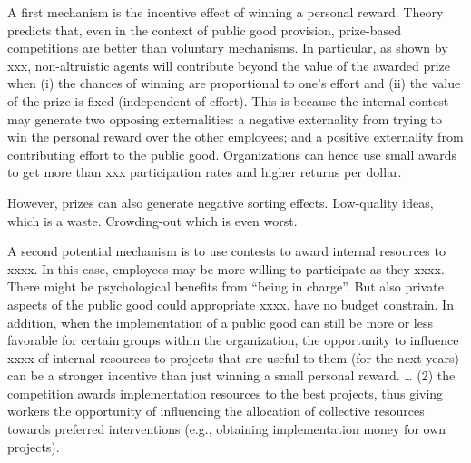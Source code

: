 \documentclass[12pt, titlepage]{article}
\begin{document}
A first mechanism is the incentive effect of winning a personal reward.
Theory predicts that, even in the context of public good provision,
prize-based competitions are better than voluntary mechanisms. In
particular, as shown by xxx, non-altruistic agents will contribute
beyond the value of the awarded prize when (i) the chances of winning
are proportional to one's effort and (ii) the value of the prize is
fixed (independent of effort). This is because the internal contest may
generate two opposing externalities: a negative externality from trying
to win the personal reward over the other employees; and a positive
externality from contributing effort to the public good. Organizations
can hence use small awards to get more than xxx participation rates and
higher returns per dollar.

However, prizes can also generate negative sorting effects. Low-quality
ideas, which is a waste. Crowding-out which is even worst.

A second potential mechanism is to use contests to award internal
resources to xxxx. In this case, employees may be more willing to
participate as they xxxx. There might be psychological benefits from
``being in charge''. But also private aspects of the public good could
appropriate xxxx. have no budget constrain. In addition, when the
implementation of a public good can still be more or less favorable for
certain groups within the organization, the opportunity to influence
xxxx of internal resources to projects that are useful to them (for the
next years) can be a stronger incentive than just winning a small
personal reward. \ldots{} (2) the competition awards implementation
resources to the best projects, thus giving workers the opportunity of
influencing the allocation of collective resources towards preferred
interventions (e.g., obtaining implementation money for own projects).
\end{document}
